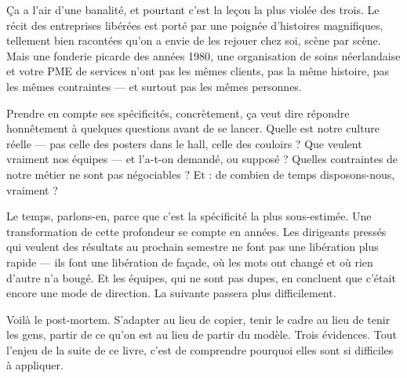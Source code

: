 Ça a l'air d'une banalité, et pourtant c'est la leçon la plus violée des trois. Le récit des entreprises libérées est porté par une poignée d'histoires magnifiques, tellement bien racontées qu'on a envie de les rejouer chez soi, scène par scène. Mais une fonderie picarde des années 1980, une organisation de soins néerlandaise et votre PME de services n'ont pas les mêmes clients, pas la même histoire, pas les mêmes contraintes — et surtout pas les mêmes personnes.

Prendre en compte ses spécificités, concrètement, ça veut dire répondre honnêtement à quelques questions avant de se lancer. Quelle est notre culture réelle — pas celle des posters dans le hall, celle des couloirs ? Que veulent vraiment nos équipes — et l'a-t-on demandé, ou supposé ? Quelles contraintes de notre métier ne sont pas négociables ? Et : de combien de temps disposons-nous, vraiment ?

Le temps, parlons-en, parce que c'est la spécificité la plus sous-estimée. Une transformation de cette profondeur se compte en années. Les dirigeants pressés qui veulent des résultats au prochain semestre ne font pas une libération plus rapide — ils font une libération de façade, où les mots ont changé et où rien d'autre n'a bougé. Et les équipes, qui ne sont pas dupes, en concluent que c'était encore une mode de direction. La suivante passera plus difficilement.

Voilà le post-mortem. S'adapter au lieu de copier, tenir le cadre au lieu de tenir les gens, partir de ce qu'on est au lieu de partir du modèle. Trois évidences. Tout l'enjeu de la suite de ce livre, c'est de comprendre pourquoi elles sont si difficiles à appliquer.
